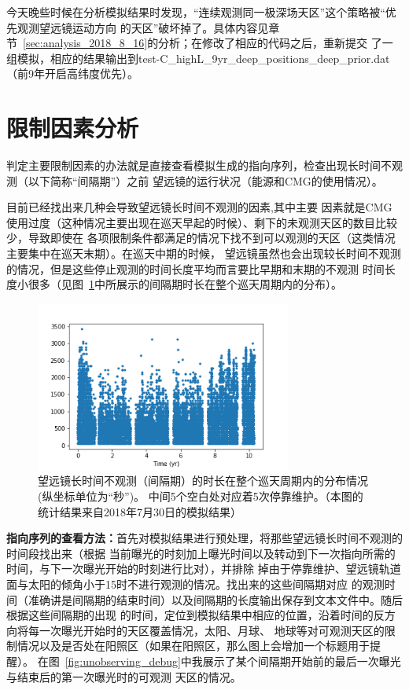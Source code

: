 \documentclass[a4paper,11pt]{ctexart}
\def\blankpage{%
      \clearpage%
      \thispagestyle{empty}%
      \addtocounter{page}{-1}%
      \null%
      \clearpage}
\begin{document}
{\heiti 今天晚些时候在分析模拟结果时发现，“连续观测同一极深场天区”这个策略被“优先观测望远镜运动方向
的天区”破坏掉了。具体内容见章节~\ref{sec:analysis_2018_8_16}的分析；在修改了相应的代码之后，重新提交
了一组模拟，相应的结果输出到test-C\_highL\_9yr\_deep\_positions\_deep\_prior.dat（前9年开启高纬度优先）。}

\blankpage

\section{限制因素分析}
\label{sec:analysis}
判定主要限制因素的办法就是直接查看模拟生成的指向序列，检查出现长时间不观测（以下简称“间隔期”）之前
望远镜的运行状况（能源和CMG的使用情况）。

目前已经找出来几种会导致望远镜长时间不观测的因素,其中主要
因素就是CMG使用过度（这种情况主要出现在巡天早起的时候）、剩下的未观测天区的数目比较少，导致即使在
各项限制条件都满足的情况下找不到可以观测的天区（这类情况主要集中在巡天末期）。在巡天中期的时候，
望远镜虽然也会出现较长时间不观测的情况，但是这些停止观测的时间长度平均而言要比早期和末期的不观测
时间长度小很多（见图~\ref{fig:time_wasted}中所展示的间隔期时长在整个巡天周期内的分布）。

\begin{figure}[h!]
\centering
\includegraphics[width=0.75\textwidth]{figures/dT_vs_time.png}
\caption{望远镜长时间不观测（间隔期）的时长在整个巡天周期内的分布情况(纵坐标单位为“秒”)。
中间5个空白处对应着5次停靠维护。（本图的统计结果来自2018年7月30日的模拟结果）}
\label{fig:time_wasted}
\end{figure}

\textbf{指向序列的查看方法：}首先对模拟结果进行预处理，将那些望远镜长时间不观测的时间段找出来（根据
当前曝光的时刻加上曝光时间以及转动到下一次指向所需的时间，与下一次曝光开始的时刻进行比对），并排除
掉由于停靠维护、望远镜轨道面与太阳的倾角小于15\textdegree 时不进行观测的情况。找出来的这些间隔期对应
的观测时间（准确讲是间隔期的结束时间）以及间隔期的长度输出保存到文本文件中。随后根据这些间隔期的出现
的时间，定位到模拟结果中相应的位置，沿着时间的反方向将每一次曝光开始时的天区覆盖情况，太阳、月球、
地球等对可观测天区的限制情况以及是否处在阳照区（如果在阳照区，那么图上会增加一个标题用于提醒）。
在图~\ref{fig:unobserving_debug}中我展示了某个间隔期开始前的最后一次曝光与结束后的第一次曝光时的可观测
天区的情况。
\end{document}
